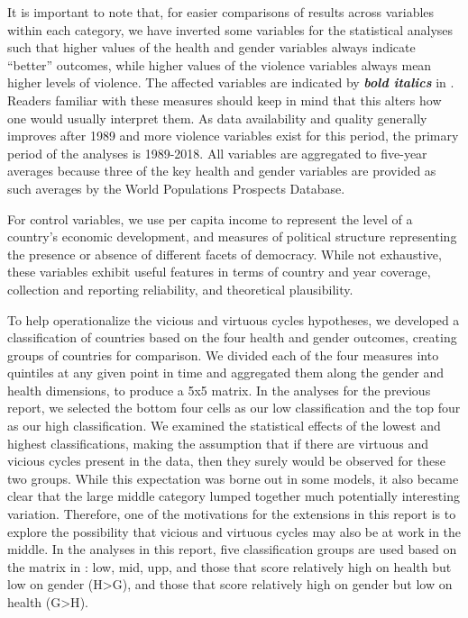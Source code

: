 \documentclass[12pt]{article}
\begin{document}
It is important to note that, for easier comparisons of results across variables within each category, we have inverted some variables for the statistical analyses such that higher values of the health and gender variables always indicate \enquote{better} outcomes, while higher values of the violence variables always mean higher levels of violence. The affected variables are indicated by \textbf{\textit{bold italics}} in . Readers familiar with these measures should keep in mind that this alters how one would usually interpret them.
As data availability and quality generally improves after 1989 and more violence variables exist for this period, the primary period of the analyses is 1989-2018. All variables are aggregated to five-year averages because three of the key health and gender variables are provided as such averages by the World Populations Prospects Database.

For control variables, we use per capita income to represent the level of a country's economic development, and measures of political structure representing the presence or absence of different facets of democracy. While not exhaustive, these variables exhibit useful features in terms of country and year coverage, collection and reporting reliability, and theoretical plausibility.



To help operationalize the vicious and virtuous cycles hypotheses, we developed a classification of countries based on the four health and gender outcomes, creating groups of countries for comparison.
We divided each of the four measures into quintiles at any given point in time and aggregated them along the gender and health dimensions, to produce a 5x5 matrix.
In the analyses for the previous report, we selected the bottom four cells as our low classification and the top four as our high classification. We examined the statistical effects of the lowest and highest classifications, making the assumption that if there are virtuous and vicious cycles present in the data, then they surely would be observed for these two groups. While this expectation was borne out in some models, it also became clear that the large middle category lumped together much potentially interesting variation. Therefore, one of the motivations for the extensions in this report is to explore the possibility that vicious and virtuous cycles may also be at work in the middle. In the analyses in this report, five classification groups are used based on the matrix in : low, mid, upp, and those that score relatively high on health but low on gender ({H>G}), and those that score relatively high on gender but low on health ({G>H}).
\end{document}
